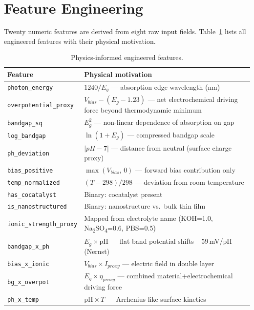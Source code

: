 \section{Feature Engineering}

Twenty numeric features are derived from eight raw input fields.
Table~\ref{tab:features} lists all engineered features with their physical
motivation.

\begin{table}[h]
\centering
\caption{Physics-informed engineered features.}
\label{tab:features}
\begin{tabular}{lp{7cm}}
\toprule
Feature & Physical motivation \\
\midrule
\texttt{photon\_energy} & $1240/E_g$ — absorption edge wavelength (nm) \\
\texttt{overpotential\_proxy} & $V_{bias} - (E_g - 1.23)$ — net electrochemical driving force beyond thermodynamic minimum \\
\texttt{bandgap\_sq} & $E_g^2$ — non-linear dependence of absorption on gap \\
\texttt{log\_bandgap} & $\ln(1+E_g)$ — compressed bandgap scale \\
\texttt{ph\_deviation} & $|pH - 7|$ — distance from neutral (surface charge proxy) \\
\texttt{bias\_positive} & $\max(V_{bias},\,0)$ — forward bias contribution only \\
\texttt{temp\_normalized} & $(T - 298)/298$ — deviation from room temperature \\
\texttt{has\_cocatalyst} & Binary: cocatalyst present \\
\texttt{is\_nanostructured} & Binary: nanostructure vs.\ bulk thin film \\
\texttt{ionic\_strength\_proxy} & Mapped from electrolyte name (KOH=1.0, Na\textsubscript{2}SO\textsubscript{4}=0.6, PBS=0.5) \\
\texttt{bandgap\_x\_ph} & $E_g \times \text{pH}$ — flat-band potential shifts $-59$\,mV/pH (Nernst) \\
\texttt{bias\_x\_ionic} & $V_{bias} \times I_{proxy}$ — electric field in double layer \\
\texttt{bg\_x\_overpot} & $E_g \times \eta_{proxy}$ — combined material+electrochemical driving force \\
\texttt{ph\_x\_temp} & $\text{pH} \times T$ — Arrhenius-like surface kinetics \\
\bottomrule
\end{tabular}
\end{table}

